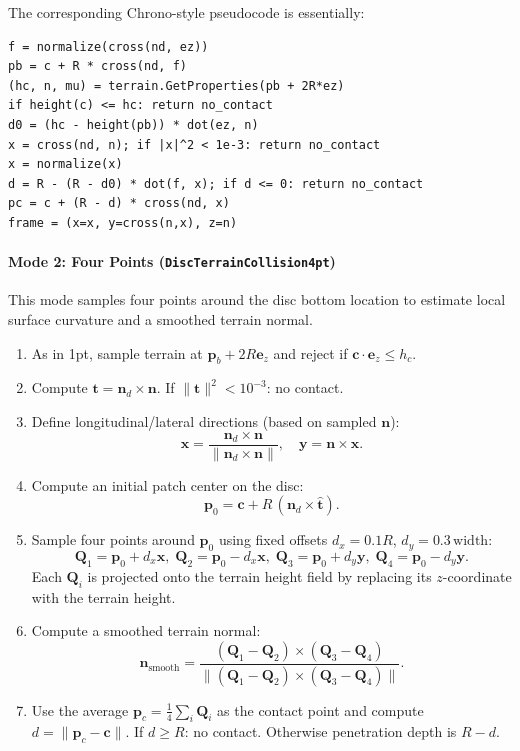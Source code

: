 \noindent
The corresponding Chrono-style pseudocode is essentially:
\begin{verbatim}
f = normalize(cross(nd, ez))
pb = c + R * cross(nd, f)
(hc, n, mu) = terrain.GetProperties(pb + 2R*ez)
if height(c) <= hc: return no_contact
d0 = (hc - height(pb)) * dot(ez, n)
x = cross(nd, n); if |x|^2 < 1e-3: return no_contact
x = normalize(x)
d = R - (R - d0) * dot(f, x); if d <= 0: return no_contact
pc = c + (R - d) * cross(nd, x)
frame = (x=x, y=cross(n,x), z=n)
\end{verbatim}

\paragraph{Mode 2: Four Points (\texttt{DiscTerrainCollision4pt})}
This mode samples four points around the disc bottom location to estimate local surface curvature and a smoothed
terrain normal.

\begin{enumerate}
  \item As in 1pt, sample terrain at \(\mathbf{p}_b + 2R\mathbf{e}_z\) and reject if \(\mathbf{c}\cdot\mathbf{e}_z \le h_c\).
  \item Compute \(\mathbf{t} = \mathbf{n}_d \times \mathbf{n}\). If \(\lVert\mathbf{t}\rVert^2 < 10^{-3}\): no contact.
  \item Define longitudinal/lateral directions (based on sampled \(\mathbf{n}\)):
    \[
      \mathbf{x} = \frac{\mathbf{n}_d \times \mathbf{n}}{\lVert \mathbf{n}_d \times \mathbf{n}\rVert},\quad
      \mathbf{y} = \mathbf{n} \times \mathbf{x}.
    \]
  \item Compute an initial patch center on the disc:
    \[
      \mathbf{p}_0 = \mathbf{c} + R\,(\mathbf{n}_d \times \hat{\mathbf{t}}).
    \]
  \item Sample four points around \(\mathbf{p}_0\) using fixed offsets
        \(d_x = 0.1R\), \(d_y = 0.3\,\text{width}\):
    \[
      \mathbf{Q}_1=\mathbf{p}_0+d_x\mathbf{x},\;
      \mathbf{Q}_2=\mathbf{p}_0-d_x\mathbf{x},\;
      \mathbf{Q}_3=\mathbf{p}_0+d_y\mathbf{y},\;
      \mathbf{Q}_4=\mathbf{p}_0-d_y\mathbf{y}.
    \]
    Each \(\mathbf{Q}_i\) is projected onto the terrain height field by replacing its \(z\)-coordinate with the terrain height.
  \item Compute a smoothed terrain normal:
    \[
      \mathbf{n}_{\text{smooth}} = \frac{(\mathbf{Q}_1-\mathbf{Q}_2)\times(\mathbf{Q}_3-\mathbf{Q}_4)}
                                        {\lVert(\mathbf{Q}_1-\mathbf{Q}_2)\times(\mathbf{Q}_3-\mathbf{Q}_4)\rVert}.
    \]
  \item Use the average \(\mathbf{p}_c = \tfrac{1}{4}\sum_i \mathbf{Q}_i\) as the contact point and compute
        \(d=\lVert \mathbf{p}_c-\mathbf{c}\rVert\). If \(d \ge R\): no contact. Otherwise penetration depth is \(R-d\).
\end{enumerate}

